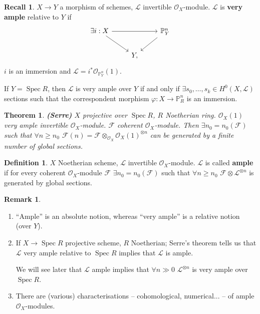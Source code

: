 \documentclass[12pt]{article}
\DeclareMathOperator{\Spec}{Spec}
\newtheorem*{theorem}{Theorem}
\theoremstyle{definition}
\newtheorem*{definition}{Definition}
\newtheorem*{remark}{Remark}
\newtheorem*{recall}{Recall}
\theoremstyle{remark}
\begin{document}
\begin{recall}
$X\rightarrow Y$ a morphism of schemes, $\mathcal{L}$ invertible $\mathcal{O}_X$-module. $\mathcal{L}$ is \textbf{very ample} relative to $Y$ if
\[
\begin{tikzcd}
\exists i:X\arrow[rr]\arrow[rd]&&\mathbb{P}_Y^n\arrow[ld]\\
&Y,
\end{tikzcd}
\]
$i$ is an immersion and $\mathcal{L}=i^*\mathcal{O}_{\mathbb{P}_Y^n}(1)$.
\end{recall}

If $Y=\Spec R$, then $\mathcal{L}$ is very ample over $Y$ if and only if $\exists s_0,\ldots,s_k\in H^0(X,\mathcal{L})$ sections such that the correspondent morphism $\varphi:X\rightarrow\mathbb{P}_R^n$ is an immersion.

\begin{theorem}
\emph{\textbf{(Serre)}} $X$ projective over $\Spec R$, $R$ Noetherian ring. $\mathcal{O}_X(1)$ very ample invertible $\mathcal{O}_X$-module. $\mathcal{F}$ coherent $\mathcal{O}_X$-module. Then $\exists n_0=n_0(\mathcal{F})$ such that $\forall n\geq n_0$ $\mathcal{F}(n)=\mathcal{F}\otimes_{\mathcal{O}_X}\mathcal{O}_X(1)^{\otimes n}$ can be generated by a finite number of global sections.
\end{theorem}

\begin{definition}
$X$ Noetherian scheme, $\mathcal{L}$ invertible $\mathcal{O}_X$-module. $\mathcal{L}$ is called \textbf{ample} if for every coherent $\mathcal{O}_X$-module $\mathcal{F}$ $\exists n_0=n_0(\mathcal{F})$ such that $\forall n\geq n_0$ $\mathcal{F}\otimes\mathcal{L}^{\otimes n}$ is generated by global sections.
\end{definition}

\begin{remark}
\begin{enumerate}[label=\arabic*)]
\item ``Ample'' is an absolute notion, whereas ``very ample'' is a relative notion (over $Y$).

\item If $X\rightarrow\Spec R$ projective scheme, $R$ Noetherian; Serre's theorem tells us that $\mathcal{L}$ very ample relative to $\Spec R$ implies that $\mathcal{L}$ is ample.

We will see later that $\mathcal{L}$ ample implies that $\forall n\gg0$ $\mathcal{L}^{\otimes n}$ is very ample over $\Spec R$.

\item There are (various) characterisations -- cohomological, numerical... -- of ample $\mathcal{O}_X$-modules.
\end{enumerate}
\end{remark}
\end{document}
